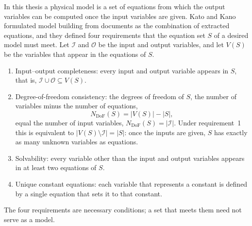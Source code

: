 In this thesis a physical model is a set of equations from which the output variables can be
computed once the input variables are given. Kato and Kano formulated model building from
documents as the combination of extracted equations, and they defined four requirements that the
equation set $S$ of a desired model must meet\cite{CombineEq}. Let $\mathcal{I}$ and $\mathcal{O}$
be the input and output variables, and let $V(S)$ be the variables that appear in the equations
of $S$.
\begin{enumerate}
  \item Input--output completeness: every input and output variable appears in $S$, that is,
    $\mathcal{I} \cup \mathcal{O} \subseteq V(S)$.
  \item Degree-of-freedom consistency: the degrees of freedom of $S$, the number of variables minus
    the number of equations\cite{Seborg},
    \begin{equation}
      N_{\mathrm{DoF}}(S) = |V(S)| - |S| ,
      \label{eq:dof}
    \end{equation}
    equal the number of input variables, $N_{\mathrm{DoF}}(S) = |\mathcal{I}|$. Under
    requirement~1 this is equivalent to $|V(S) \setminus \mathcal{I}| = |S|$: once the inputs are
    given, $S$ has exactly as many unknown variables as equations.
  \item Solvability: every variable other than the input and output variables appears in at least
    two equations of $S$.
  \item Unique constant equations: each variable that represents a constant is defined by a single
    equation that sets it to that constant.
\end{enumerate}
The four requirements are necessary conditions; a set that meets them need not serve as a
model\cite{CombineEq}.

